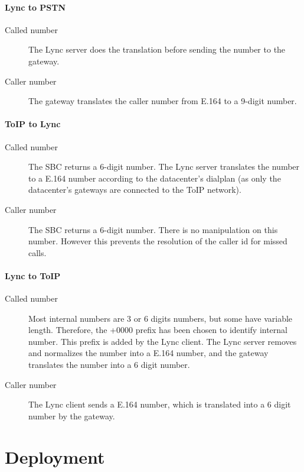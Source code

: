 	\paragraph{Lync to PSTN}
	\begin{description}
		\item[Called number] The Lync server does the translation before sending the number to the gateway.
		\item[Caller number] The gateway translates the caller number from E.164 to a 9-digit number.
	\end{description}

	\paragraph{ToIP to Lync}
	\begin{description}
		\item[Called number] The SBC returns a 6-digit number. The Lync server translates the number to a E.164 number according to the datacenter's dialplan (as only the datacenter's gateways are connected to the ToIP network).
		\item[Caller number] The SBC returns a 6-digit number. There is no manipulation on this number. However this prevents the resolution of the caller id for missed calls.
	\end{description}

	\paragraph{Lync to ToIP}
	\begin{description}
		\item[Called number] Most internal numbers are 3 or 6 digits numbers, but some have variable length. Therefore, the +0000 prefix has been chosen to identify internal number. This prefix is added by the Lync client. The Lync server removes and normalizes the number into a E.164 number, and the gateway translates the number into a 6 digit number.
		\item[Caller number] The Lync client sends a E.164 number, which is translated into a 6 digit number by the gateway.
	\end{description}
	

\section{Deployment}

